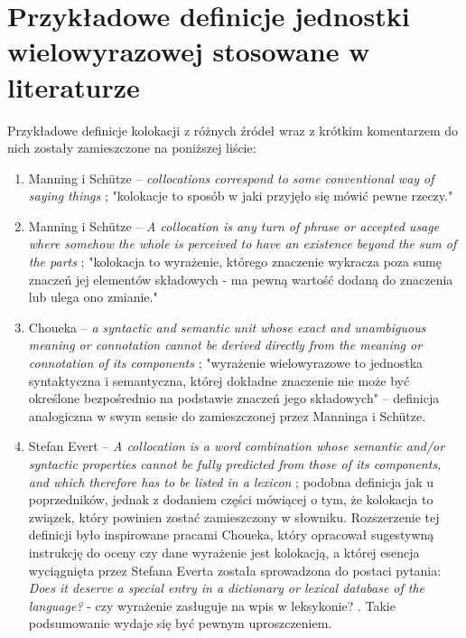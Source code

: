 \section{Przykładowe definicje jednostki wielowyrazowej stosowane w literaturze}
Przykładowe definicje kolokacji z różnych źródeł wraz z krótkim komentarzem do nich zostały zamieszczone na poniższej liście:

\begin{enumerate}
\item 
Manning i Schütze -- \emph{collocations correspond to some conventional way of saying things} \cite[str. 151]{mit};
\newline
"kolokacje to sposób w jaki przyjęło się mówić pewne rzeczy."
\newline		
		
\item 
Manning i Schütze -- \emph{A collocation is any turn of phrase or accepted usage where somehow the whole is perceived to have an existence beyond the sum of the parts} \cite[str. 29]{mit}; 
\newline
"kolokacja to wyrażenie, którego znaczenie wykracza poza sumę znaczeń jej elementów składowych - ma pewną wartość dodaną do znaczenia lub ulega ono zmianie."
\newline

\item
Choueka -- \emph{a syntactic and semantic unit whose exact and unambiguous meaning or connotation cannot be derived directly from the meaning or connotation of its components} \cite[str. 1]{coling};
\newline
"wyrażenie wielowyrazowe to jednostka syntaktyczna i semantyczna, której dokładne znaczenie nie może być określone bezpośrednio na podstawie znaczeń jego składowych" -- definicja analogiczna w swym sensie do zamieszczonej przez Manninga i Schütze.		
\newline		
		
\item 
Stefan Evert -- \emph{A collocation is a word combination whose semantic and/or syntactic properties cannot be fully predicted from those of its components, and which therefore has to be listed in a lexicon} \cite[str. 17]{evert}; \newline
podobna definicja jak u poprzedników, jednak z dodaniem części mówiącej o tym, że kolokacja to związek, który powinien zostać zamieszczony w słowniku.
Rozszerzenie tej definicji było inspirowane pracami Choueka, który opracował sugestywną instrukcję do oceny czy dane wyrażenie jest kolokacją, a której esencja wyciągnięta przez Stefana Everta została sprowadzona do postaci pytania: \emph{Does it deserve a special entry in a dictionary or lexical database of the language?} - czy wyrażenie zasługuje na wpis w leksykonie? \cite[str. 17]{evert}.
Takie podsumowanie wydaje się być pewnym uproszczeniem.
\end{enumerate}

